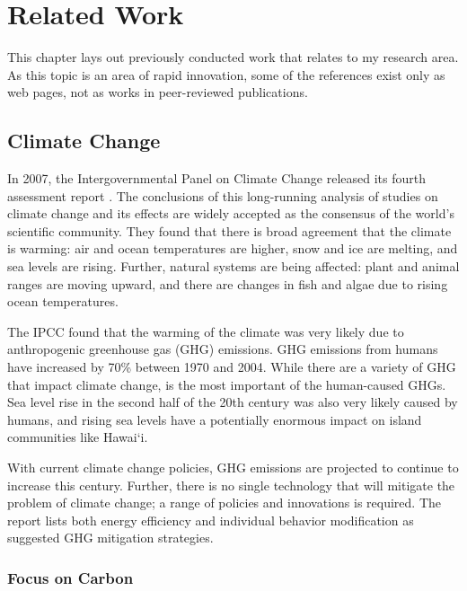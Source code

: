 \chapter{Related Work}

This chapter lays out previously conducted work that relates to my research area. As this topic is an area of rapid innovation, some of the references exist only as web pages, not as works in peer-reviewed publications. 

\section{Climate Change}
\label{climate-change}

In 2007, the Intergovernmental Panel on Climate Change released its fourth assessment report \cite{IPCC-synthesis-report-2007}. The conclusions of this long-running analysis of studies on climate change and its effects are widely accepted as the consensus of the world's scientific community. They found that there is broad agreement that the climate is warming: air and ocean temperatures are higher, snow and ice are melting, and sea levels are rising. Further, natural systems are being affected: plant and animal ranges are moving upward, and there are changes in fish and algae due to rising ocean temperatures.

The IPCC found that the warming of the climate was very likely due to anthropogenic greenhouse gas (GHG) emissions. GHG emissions from humans have increased by 70\% between 1970 and 2004. While there are a variety of GHG that impact climate change, \COtwo is the most important of the human-caused GHGs. Sea level rise in the second half of the 20th century was also very likely caused by humans, and rising sea levels have a potentially enormous impact on island communities like Hawai`i.

With current climate change policies, GHG emissions are projected to continue to increase this century. Further, there is no single technology that will mitigate the problem of climate change; a range of policies and innovations is required. The report lists both energy efficiency and individual behavior modification as suggested GHG mitigation strategies.

\subsection{Focus on Carbon}

